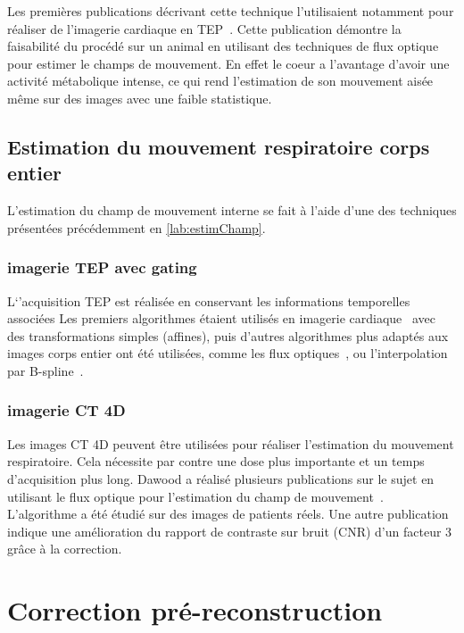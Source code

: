 Les premières publications décrivant cette technique l'utilisaient notamment pour réaliser de l'imagerie cardiaque en TEP~\cite{klein19973d}. Cette publication démontre la faisabilité du procédé sur un animal en utilisant des techniques de flux optique pour estimer le champs de mouvement. En effet le coeur a l'avantage d'avoir une activité métabolique intense, ce qui rend l'estimation de son mouvement aisée même sur des images avec une faible statistique.

\subsection{Estimation du mouvement respiratoire corps entier}

L'estimation du champ de mouvement interne se fait à l'aide d'une des techniques présentées précédemment en \ref{lab:estimChamp}.

\subsubsection{imagerie TEP avec gating}
\label{lab:correctionDawood2008}

L`'acquisition TEP est réalisée en conservant les informations temporelles associées 
Les premiers algorithmes étaient utilisés en imagerie cardiaque~\cite{klein2002four} avec des transformations simples (affines), puis d'autres algorithmes plus adaptés aux images corps entier ont été utilisées, comme les flux optiques~\cite{dawood2006lung, dawood2006lung}, ou l'interpolation par B-spline~\cite{bai2009regularized}. 


\subsubsection{imagerie CT 4D}

Les images CT 4D peuvent être utilisées pour réaliser l'estimation du mouvement respiratoire. Cela nécessite par contre une dose plus importante et un temps d'acquisition plus long.
Dawood a réalisé plusieurs publications sur le sujet en utilisant le flux optique pour l'estimation du champ de mouvement~\cite{dawood2006lung, dawood2008respiratory}. L'algorithme a été étudié sur des images de patients réels. Une autre publication~\cite{thorndyke2006reducing} indique une amélioration du rapport de contraste sur bruit (CNR) d'un facteur 3 grâce à la correction.


\section{Correction pré-reconstruction}


